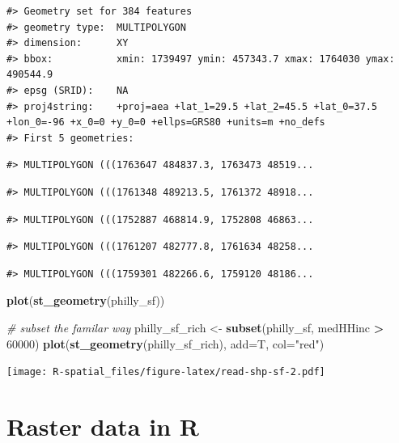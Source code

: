 \documentclass[]{book}
\newenvironment{Shaded}{\begin{snugshade}}{\end{snugshade}}
\newcommand{\KeywordTok}[1]{\textcolor[rgb]{0.13,0.29,0.53}{\textbf{#1}}}
\newcommand{\DataTypeTok}[1]{\textcolor[rgb]{0.13,0.29,0.53}{#1}}
\newcommand{\DecValTok}[1]{\textcolor[rgb]{0.00,0.00,0.81}{#1}}
\newcommand{\StringTok}[1]{\textcolor[rgb]{0.31,0.60,0.02}{#1}}
\newcommand{\CommentTok}[1]{\textcolor[rgb]{0.56,0.35,0.01}{\textit{#1}}}
\newcommand{\OperatorTok}[1]{\textcolor[rgb]{0.81,0.36,0.00}{\textbf{#1}}}
\newcommand{\NormalTok}[1]{#1}
\theoremstyle{definition}
\theoremstyle{definition}
\theoremstyle{definition}
\theoremstyle{remark}
\begin{document}
\begin{verbatim}
#> Geometry set for 384 features 
#> geometry type:  MULTIPOLYGON
#> dimension:      XY
#> bbox:           xmin: 1739497 ymin: 457343.7 xmax: 1764030 ymax: 490544.9
#> epsg (SRID):    NA
#> proj4string:    +proj=aea +lat_1=29.5 +lat_2=45.5 +lat_0=37.5 +lon_0=-96 +x_0=0 +y_0=0 +ellps=GRS80 +units=m +no_defs
#> First 5 geometries:
\end{verbatim}

\begin{verbatim}
#> MULTIPOLYGON (((1763647 484837.3, 1763473 48519...
\end{verbatim}

\begin{verbatim}
#> MULTIPOLYGON (((1761348 489213.5, 1761372 48918...
\end{verbatim}

\begin{verbatim}
#> MULTIPOLYGON (((1752887 468814.9, 1752808 46863...
\end{verbatim}

\begin{verbatim}
#> MULTIPOLYGON (((1761207 482777.8, 1761634 48258...
\end{verbatim}

\begin{verbatim}
#> MULTIPOLYGON (((1759301 482266.6, 1759120 48186...
\end{verbatim}

\begin{Shaded}
\begin{Highlighting}[]
\KeywordTok{plot}\NormalTok{(}\KeywordTok{st_geometry}\NormalTok{(philly_sf))}

\CommentTok{# subset the familar way}
\NormalTok{philly_sf_rich <-}\StringTok{ }\KeywordTok{subset}\NormalTok{(philly_sf, medHHinc }\OperatorTok{>}\StringTok{ }\DecValTok{60000}\NormalTok{)}
\KeywordTok{plot}\NormalTok{(}\KeywordTok{st_geometry}\NormalTok{(philly_sf_rich), }\DataTypeTok{add=}\NormalTok{T, }\DataTypeTok{col=}\StringTok{"red"}\NormalTok{)}
\end{Highlighting}
\end{Shaded}

\texttt{[image: R-spatial\_files/figure-latex/read-shp-sf-2.pdf]}

\section{Raster data in R}\label{raster-data-in-r}
\end{document}
